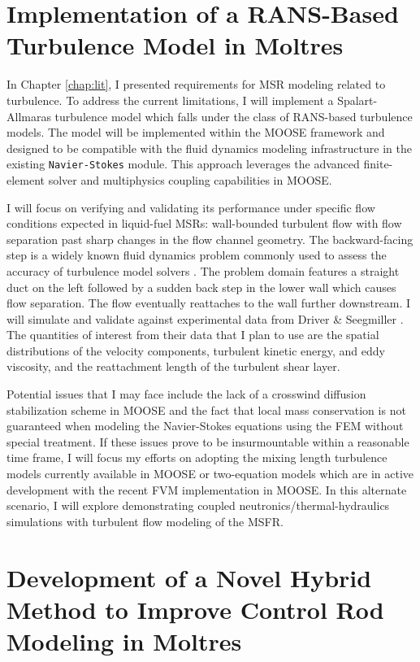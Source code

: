 \section{Implementation of a RANS-Based Turbulence Model in Moltres} \label{sec:turb}

In Chapter \ref{chap:lit}, I presented requirements for \gls{MSR} modeling related to turbulence.
To address the current limitations, I will implement a Spalart-Allmaras turbulence model which
falls under the class of \gls{RANS}-based turbulence models. The
model will be implemented within the \gls{MOOSE} framework and
designed to be compatible with the fluid dynamics modeling infrastructure in
the existing \texttt{Navier-Stokes} module. This approach leverages the
advanced finite-element solver and multiphysics coupling capabilities in
\gls{MOOSE}.

I will
focus on verifying and validating its performance under specific flow conditions expected in
liquid-fuel \glspl{MSR}: wall-bounded turbulent flow with flow separation past
sharp changes in the flow channel geometry. The backward-facing step is a
widely known fluid dynamics problem commonly used to assess the accuracy of
turbulence model solvers \cite{lasher_computation_1992}.
The problem domain features a straight duct
on the left followed by a sudden back step in the lower wall which causes flow
separation. The flow eventually reattaches to the wall further downstream.
I will simulate and validate against experimental data from Driver \&
Seegmiller \cite{driver_features_1985}. The quantities of interest from their data that I plan to
use are the spatial distributions of the velocity components, turbulent
kinetic energy, and eddy viscosity, and the reattachment length of the
turbulent shear layer.

Potential issues that I may face include the lack of a crosswind diffusion stabilization scheme in
\gls{MOOSE} and the fact that local mass conservation is not guaranteed when modeling the
Navier-Stokes equations using the \gls{FEM} without special treatment. If these issues prove to be
insurmountable within a reasonable time frame, I will focus my efforts on adopting the mixing
length turbulence models currently available in \gls{MOOSE} or two-equation models which are in
active development with the recent \gls{FVM} implementation in \gls{MOOSE}. In this alternate
scenario, I will explore demonstrating coupled neutronics/thermal-hydraulics simulations with
turbulent flow modeling of the \gls{MSFR}.

\section{Development of a Novel Hybrid Method to Improve Control Rod Modeling in Moltres}
\label{sec:devel-hybrid}

